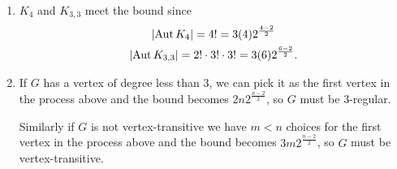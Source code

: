 \documentclass[a4paper, 12pt]{article}
\DeclarePairedDelimiter\abs{\lvert}{\rvert}
\DeclareMathOperator{\aut}{Aut}
\begin{document}
\begin{enumerate}
\begin{enumerate}
\item \(K_4\) and \(K_{3,3}\) meet the bound since
\begin{gather*}
\abs{\aut K_4}=4!=3(4)2^{\frac{4-2}2}\\
\abs{\aut K_{3,3}}=2!\cdot3!\cdot3!=3(6)2^{\frac{6-2}2}.
\end{gather*}

\item If \(G\) has a vertex of degree less than 3, we can pick it as the first vertex in the process above and the bound becomes \(2n2^{\frac{n-2}2}\), so \(G\) must be 3-regular.

Similarly if \(G\) is not vertex-transitive we have \(m<n\) choices for the first vertex in the process above and the bound becomes \(3m2^{\frac{n-2}2}\), so \(G\) must be vertex-transitive.



\end{enumerate}

\end{enumerate}
\end{document}

